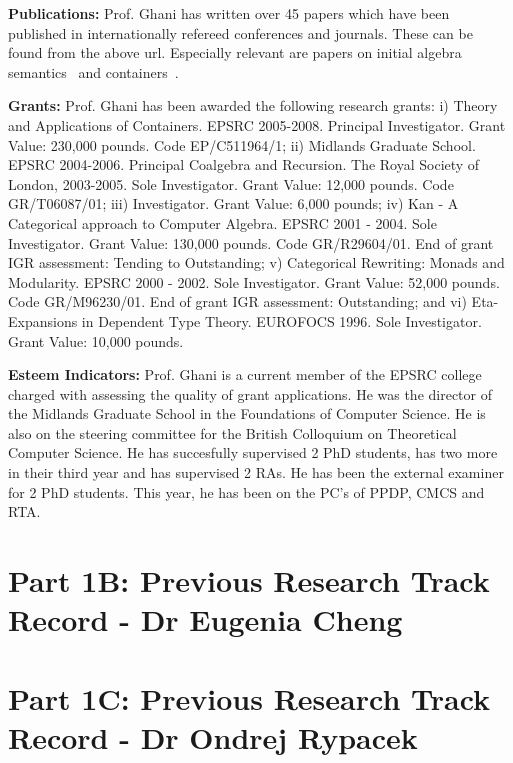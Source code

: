 \documentclass[a4paper,10pt]{article}
\begin{document}
{\bf Publications:} Prof. Ghani has written over 45 papers which have been
published in internationally refereed conferences and journals. These
can be found from the above url. Especially relevant are papers on
initial algebra semantics~\cite{ghani-tlca07,ghani-popl08} and
containers~\cite{ghani-fossacs03,ghani-appsem04,ghani-fi04,ghani-icalp04,ghani-jcats07}.

{\bf Grants:} Prof. Ghani has been awarded the following research grants: i)
Theory and Applications of Containers. EPSRC 2005-2008. Principal
Investigator. Grant Value: 230,000 pounds. Code EP/C511964/1; ii)
Midlands Graduate School. EPSRC 2004-2006. Principal
Coalgebra and Recursion. The Royal Society of London, 2003-2005. Sole
Investigator. Grant Value: 12,000 pounds. Code GR/T06087/01; iii)
Investigator. Grant Value: 6,000 pounds; iv) Kan - A Categorical
approach to Computer Algebra. EPSRC 2001 - 2004. Sole
Investigator. Grant Value: 130,000 pounds. Code GR/R29604/01. End of
grant IGR assessment: Tending to Outstanding; v) Categorical
Rewriting: Monads and Modularity. EPSRC 2000 - 2002. Sole
Investigator. Grant Value: 52,000 pounds. Code GR/M96230/01.  End of
grant IGR assessment: Outstanding; and vi) Eta-Expansions in Dependent
Type Theory. EUROFOCS 1996. Sole Investigator. Grant Value: 10,000
pounds.

{\bf Esteem Indicators:} Prof. Ghani is a current member of the EPSRC
college charged with assessing the quality of grant applications. He
was the director of the Midlands Graduate School in the Foundations of
Computer Science. He is also on the steering committee for the British
Colloquium on Theoretical Computer Science. He has succesfully
supervised 2 PhD students, has two more in their third year and has
supervised 2 RAs. He has been the external examiner for 2 PhD
students. This year, he has been on the PC's of PPDP, CMCS and RTA.


\section*{Part 1B: Previous Research Track Record - Dr Eugenia Cheng}

\vspace*{1in}

\section*{Part 1C: Previous Research Track Record - Dr Ondrej Rypacek}


\vspace*{1in}
\end{document}
